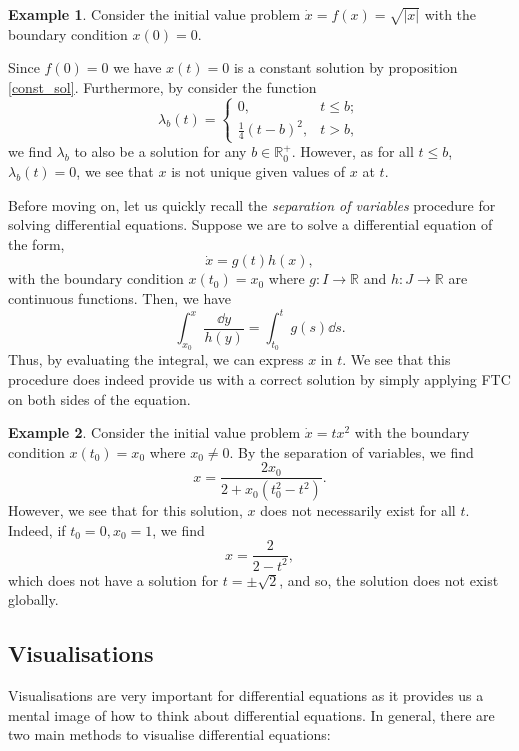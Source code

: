 \documentclass[
]{article}
\theoremstyle{definition}
\newtheorem{example}{Example}
\theoremstyle{definition}
\begin{document}
\begin{example}
  Consider the initial value problem \(\dot x = f(x) = \sqrt{|x|}\) with the 
  boundary condition \(x(0) = 0\).

  Since \(f(0) = 0\) we have \(x(t) = 0\) is a constant solution by 
  proposition \ref{const_sol}. Furthermore, by consider the function 
  \[\lambda_b(t) = 
  \begin{cases}
    0, & t \le b;\\
    \frac{1}{4}(t - b)^2, & t > b,
  \end{cases}\]
  we find \(\lambda_b\) to also be a solution for any \(b \in \mathbb{R}^+_0\).
  However, as for all \(t \le b\), \(\lambda_b(t) = 0\), we see that \(x\) is 
  not unique given values of \(x\) at \(t\).
\end{example}

Before moving on, let us quickly recall the \emph{separation of
variables} procedure for solving differential equations. Suppose we are
to solve a differential equation of the form, \[\dot x = g(t) h(x),\]
with the boundary condition \(x(t_0) = x_0\) where
\(g : I \to \mathbb{R}\) and \(h : J \to \mathbb{R}\) are continuous
functions. Then, we have
\[\int_{x_0} ^x\frac{\dd y}{h(y)} = \int_{t_0}^t g(s) \dd s.\] Thus, by
evaluating the integral, we can express \(x\) in \(t\). We see that this
procedure does indeed provide us with a correct solution by simply
applying FTC on both sides of the equation.

\begin{example}
  Consider the initial value problem \(\dot x = t x^2\) with the boundary condition 
  \(x(t_0) = x_0\) where \(x_0 \neq 0\). By the separation of variables, we find 
  \[x = \frac{2x_0}{2 + x_0(t_0^2 - t^2)}.\]
  However, we see that for this solution, \(x\) does not necessarily exist for 
  all \(t\). Indeed, if \(t_0 = 0, x_0 = 1\), we find 
  \[x = \frac{2}{2 - t^2},\]
  which does not have a solution for \(t = \pm\sqrt{2}\), and so, the solution 
  does not exist globally.
\end{example}

\hypertarget{visualisations}{%
\subsection{Visualisations}\label{visualisations}}

Visualisations are very important for differential equations as it
provides us a mental image of how to think about differential equations.
In general, there are two main methods to visualise differential
equations:
\end{document}
